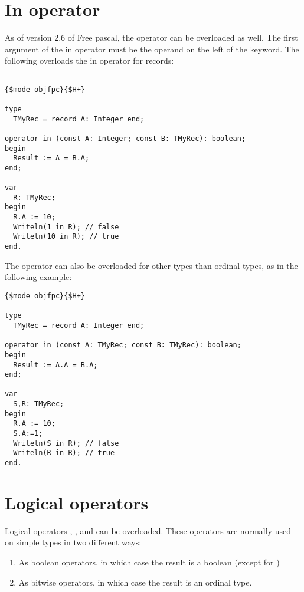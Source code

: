 \section{In operator}
As of version 2.6 of Free pascal, the  operator can be overloaded as well.
The first argument of the in operator must be the operand on the left of the
 keyword.
The following overloads the in operator for records:
\begin{verbatim}

{$mode objfpc}{$H+}

type
  TMyRec = record A: Integer end;

operator in (const A: Integer; const B: TMyRec): boolean;
begin
  Result := A = B.A;
end;

var
  R: TMyRec;
begin
  R.A := 10;
  Writeln(1 in R); // false
  Writeln(10 in R); // true
end.
\end{verbatim}
The  operator can also be overloaded for other types than ordinal
types, as in the following example:
\begin{verbatim}
{$mode objfpc}{$H+}

type
  TMyRec = record A: Integer end;

operator in (const A: TMyRec; const B: TMyRec): boolean;
begin
  Result := A.A = B.A;
end;

var
  S,R: TMyRec;
begin
  R.A := 10;
  S.A:=1;
  Writeln(S in R); // false
  Writeln(R in R); // true
end.
\end{verbatim}

\section{Logical operators}
Logical operators , ,  and  can be overloaded.
These operators are normally used on simple types in two different ways:
\begin{enumerate}
\item As boolean operators, in which case the result is a boolean (except for )
\item As bitwise operators, in which case the result is an ordinal type.
\end{enumerate}

